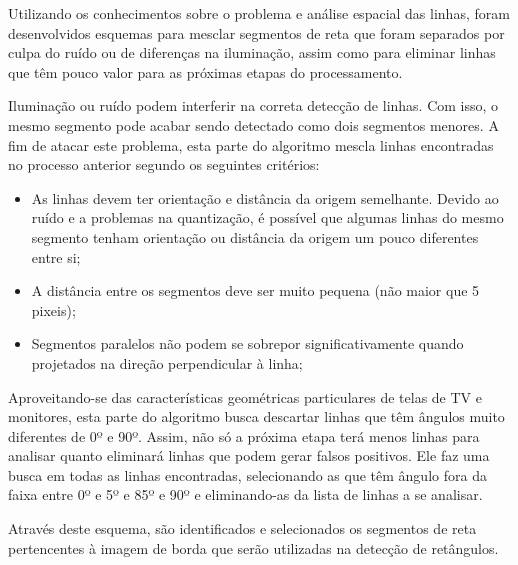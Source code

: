 Utilizando os conhecimentos sobre o problema e análise espacial das linhas, foram desenvolvidos esquemas para mesclar segmentos de reta que foram separados por culpa do ruído ou de diferenças na iluminação, assim como para eliminar linhas que têm pouco valor para as próximas etapas do processamento.


Iluminação ou ruído podem interferir na correta detecção de linhas. Com isso, o mesmo segmento pode acabar sendo detectado como dois segmentos menores. A fim de atacar este problema, esta parte do algoritmo mescla linhas encontradas no processo anterior segundo os seguintes critérios:
\begin{itemize}
\item As linhas devem ter orientação e distância da origem semelhante. Devido ao ruído e a problemas na quantização, é possível que algumas linhas do mesmo segmento tenham orientação ou distância da origem um pouco diferentes entre si;
\item A distância entre os segmentos deve ser muito pequena (não maior que 5 pixeis);
\item Segmentos paralelos não podem se sobrepor significativamente quando projetados na direção perpendicular à linha;
\end{itemize}



Aproveitando-se das características geométricas particulares de telas de TV e monitores, esta parte do algoritmo busca descartar linhas que têm ângulos muito diferentes de 0º e 90º. Assim, não só a próxima etapa terá menos linhas para analisar quanto eliminará linhas que podem gerar falsos positivos.
Ele faz uma busca em todas as linhas encontradas, selecionando as que têm ângulo fora da faixa entre 0º e 5º e 85º e 90º e eliminando-as da lista de linhas a se analisar.

Através deste esquema, são identificados e selecionados os segmentos de reta pertencentes à imagem de borda que serão utilizadas na detecção de retângulos.






